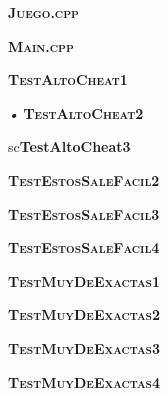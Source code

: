 \documentclass[a4paper]{article}
\begin{document}
\begin{center}
\textsc{\Large \bfseries Juego.cpp}
\end{center}

\newpage

\begin{center}
\textsc{\Large \bfseries Main.cpp}
\end{center}

\newpage

\begin{center}
\textsc{\Large \bfseries TestAltoCheat1}
\end{center}

\newpage

\begin{center}\textit{•}
\textsc{\Large \bfseries TestAltoCheat2}
\end{center}

\newpage

\begin{center}
\text\begin{footnotesize}
\end{footnotesize}sc{\Large \bfseries TestAltoCheat3}
\end{center}

\newpage

\begin{center}
\textsc{\Large \bfseries TestEstosSaleFacil2}
\end{center}

\newpage

\begin{center}
\textsc{\Large \bfseries TestEstosSaleFacil3}
\end{center}

\newpage

\begin{center}
\textsc{\Large \bfseries TestEstosSaleFacil4}
\end{center}

\newpage

\begin{center}
\textsc{\Large \bfseries TestMuyDeExactas1}
\end{center}

\newpage

\begin{center}
\textsc{\Large \bfseries TestMuyDeExactas2}
\end{center}

\newpage

\begin{center}
\textsc{\Large \bfseries TestMuyDeExactas3}
\end{center}

\newpage

\begin{center}
\textsc{\Large \bfseries TestMuyDeExactas4}
\end{center}

\newpage
\end{document}
